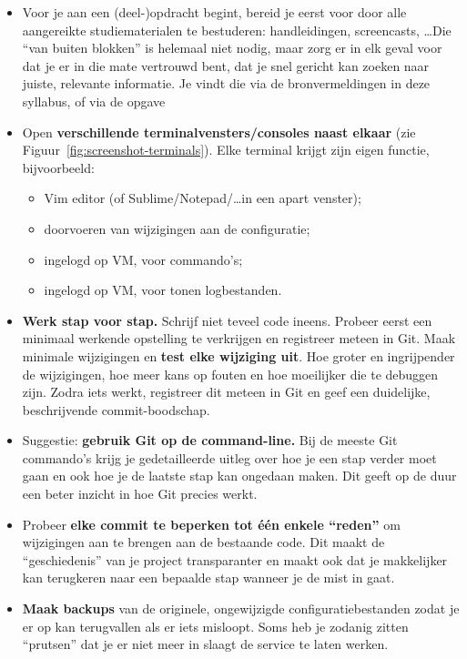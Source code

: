 \begin{itemize}
  \item Voor je aan een (deel-)opdracht begint, bereid je eerst voor door alle aangereikte studiematerialen te bestuderen: handleidingen, screencasts, \ldots Die ``van buiten blokken'' is helemaal niet nodig, maar zorg er in elk geval voor dat je er in die mate vertrouwd bent, dat je snel gericht kan zoeken naar juiste, relevante informatie. Je vindt die via de bronvermeldingen in deze syllabus, of via de opgave
  \item Open \textbf{verschillende terminalvensters/consoles naast elkaar} (zie Figuur~\ref{fig:screenshot-terminals}). Elke terminal krijgt zijn eigen functie, bijvoorbeeld:
    \begin{itemize}
      \item Vim editor (of Sublime/Notepad/\ldots in een apart venster);
      \item doorvoeren van wijzigingen aan de configuratie;
      \item ingelogd op VM, voor commando's;
      \item ingelogd op VM, voor tonen logbestanden.
    \end{itemize}
  \item \textbf{Werk stap voor stap.} Schrijf niet teveel code ineens. Probeer eerst een minimaal werkende opstelling te verkrijgen en registreer meteen in Git. Maak minimale wijzigingen en \textbf{test elke wijziging uit}. Hoe groter en ingrijpender de wijzigingen, hoe meer kans op fouten en hoe moeilijker die te debuggen zijn. Zodra iets werkt, registreer dit meteen in Git en geef een duidelijke, beschrijvende commit-boodschap.
  \item Suggestie: \textbf{gebruik Git op de command-line.} Bij de meeste Git commando's krijg je gedetailleerde uitleg over hoe je een stap verder moet gaan en ook hoe je de laatste stap kan ongedaan maken. Dit geeft op de duur een beter inzicht in hoe Git precies werkt.
  \item Probeer \textbf{elke commit te beperken tot één enkele ``reden''} om wijzigingen aan te brengen aan de bestaande code. Dit maakt de ``geschiedenis'' van je project transparanter en maakt ook dat je makkelijker kan terugkeren naar een bepaalde stap wanneer je de mist in gaat.
  \item \textbf{Maak backups} van de originele, ongewijzigde configuratiebestanden zodat je er op kan terugvallen als er iets misloopt. Soms heb je zodanig zitten ``prutsen'' dat je er niet meer in slaagt de service te laten werken.

\end{itemize}
